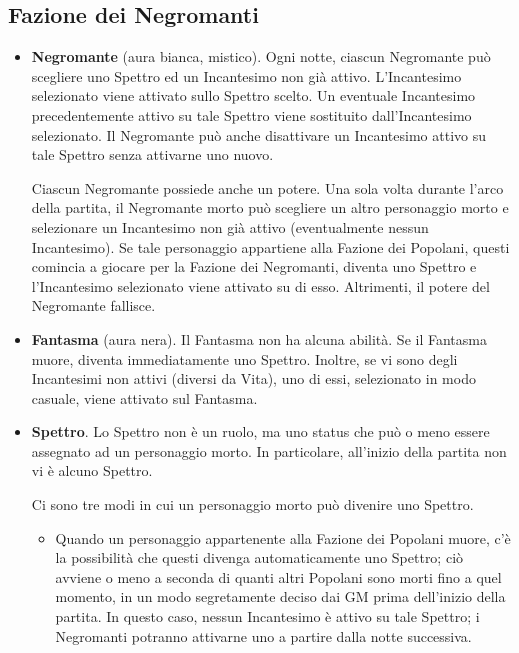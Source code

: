 \documentclass[a4paper,10pt]{article}
\begin{document}
\subsection*{Fazione dei Negromanti}
\label{negromanti}

\begin{itemize}

	\item {\bf Negromante} (aura bianca, mistico). Ogni notte, ciascun Negromante può scegliere uno Spettro ed un Incantesimo non già attivo. L'Incantesimo selezionato viene attivato sullo Spettro scelto.
	Un eventuale Incantesimo precedentemente attivo su tale Spettro viene sostituito dall'Incantesimo selezionato.
	Il Negromante può anche disattivare un Incantesimo attivo su tale Spettro senza attivarne uno nuovo.
	
	Ciascun Negromante possiede anche un potere. Una sola volta durante l'arco della partita, il Negromante morto può scegliere un altro personaggio morto e selezionare un Incantesimo non già attivo (eventualmente nessun Incantesimo). Se tale personaggio appartiene alla Fazione dei Popolani, questi comincia a giocare per la Fazione dei Negromanti, diventa uno Spettro e l'Incantesimo selezionato viene attivato su di esso. Altrimenti, il potere del Negromante fallisce.
 
	\item {\bf Fantasma} (aura nera). Il Fantasma non ha alcuna abilità. Se il Fantasma muore, diventa immediatamente uno Spettro. Inoltre, se vi sono degli Incantesimi non attivi (diversi da Vita), uno di essi, selezionato in modo casuale, viene attivato sul Fantasma.

	\item {\bf Spettro}. Lo Spettro non è un ruolo, ma uno status che può o meno essere assegnato ad un personaggio morto. In particolare, all'inizio della partita non vi è alcuno Spettro.
	
	Ci sono tre modi in cui un personaggio morto può divenire uno Spettro.
	
	\begin{itemize}
		\item Quando un personaggio appartenente alla Fazione dei Popolani muore, c'è la possibilità che questi divenga automaticamente uno Spettro; ciò avviene o meno a seconda di quanti altri Popolani sono morti fino a quel momento, in un modo segretamente deciso dai GM prima dell'inizio della partita. In questo caso, nessun Incantesimo è attivo su tale Spettro; i Negromanti potranno attivarne uno a partire dalla notte successiva.
		

\end{itemize}
\end{itemize}
\end{document}
